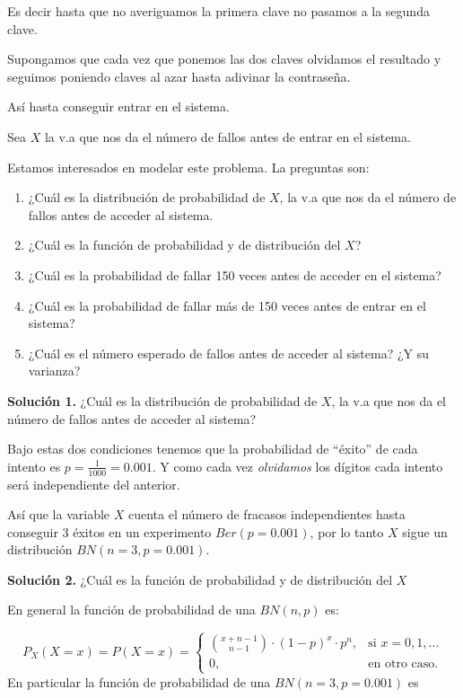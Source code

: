 \documentclass[
  letterpaper,
  DIV=11,
  numbers=noendperiod]{scrreprt}
\providecommand{\tightlist}{%
  \setlength{\itemsep}{0pt}\setlength{\parskip}{0pt}}\usepackage{longtable,booktabs,array}
\begin{document}
Es decir hasta que no averiguamos la primera clave no pasamos a la
segunda clave.

Supongamos que cada vez que ponemos las dos claves olvidamos el
resultado y seguimos poniendo claves al azar hasta adivinar la
contraseña.

Así hasta conseguir entrar en el sistema.

Sea \(X\) la v.a que nos da el número de fallos antes de entrar en el
sistema.

Estamos interesados en modelar este problema. La preguntas son:

\begin{enumerate}
\def\labelenumi{\arabic{enumi}.}
\tightlist
\item
  ¿Cuál es la distribución de probabilidad de \(X\), la v.a que nos da
  el número de fallos antes de acceder al sistema.
\item
  ¿Cuál es la función de probabilidad y de distribución del \(X\)?
\item
  ¿Cuál es la probabilidad de fallar 150 veces antes de acceder en el
  sistema?
\item
  ¿Cuál es la probabilidad de fallar más de 150 veces antes de entrar en
  el sistema?
\item
  ¿Cuál es el número esperado de fallos antes de acceder al sistema? ¿Y
  su varianza?
\end{enumerate}

\textbf{Solución 1.} ¿Cuál es la distribución de probabilidad de \(X\),
la v.a que nos da el número de fallos antes de acceder al sistema?

Bajo estas dos condiciones tenemos que la probabilidad de ``éxito'' de
cada intento es \(p=\frac{1}{1000}=0.001\). Y como cada vez
\emph{olvidamos} los dígitos cada intento será independiente del
anterior.

Así que la variable \(X\) cuenta el número de fracasos independientes
hasta conseguir 3 éxitos en un experimento \(Ber(p=0.001)\), por lo
tanto \(X\) sigue un distribución \(BN(n=3,p=0.001).\)

\textbf{Solución 2.} ¿Cuál es la función de probabilidad y de
distribución del \(X\)

En general la función de probabilidad de una \(BN(n,p)\) es:

\[
P_X(X=x)=P(X=x)=
\left\{
\begin{array}{cc} 
{x+n-1\choose n-1} \cdot (1-p)^{x}\cdot p^n, & \mbox{si }  x=0,1,\ldots \\ 0, & \mbox{en otro caso.}\end{array}\right.
\] En particular la función de probabilidad de una \(BN(n=3,p=0.001)\)
es
\end{document}
